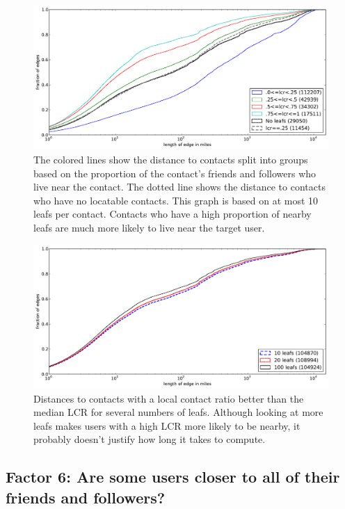 \documentclass[letterpaper]{article}
\begin{document}
\begin{figure}[tbh]
\centering
\includegraphics[width=\linewidth]{figures/locals_10.pdf}
\caption{
The colored lines show the distance to contacts split into groups based on the
proportion of the contact's friends and followers who live near the contact.
The dotted line shows the distance to contacts who have no locatable contacts.
This graph is based on at most 10 leafs per contact.
Contacts who have a high proportion of nearby leafs are much more likely to
live near the target user.
}
\label{fig:Local10}
\end{figure}

\begin{figure}[tbh]
\centering
\includegraphics[width=\linewidth]{figures/locals_cmp.pdf}
\caption{
    Distances to contacts with a local contact ratio better than the median LCR
    for several numbers of leafs.
    Although looking at more leafs makes users with a high LCR more likely to
    be nearby, it probably doesn't justify how long it takes to compute.
}
\label{fig:LocalCmp}
\end{figure}

\subsection{Factor 6: Are some users closer to all of their friends and followers?}
\label{sec:closer}
\end{document}
